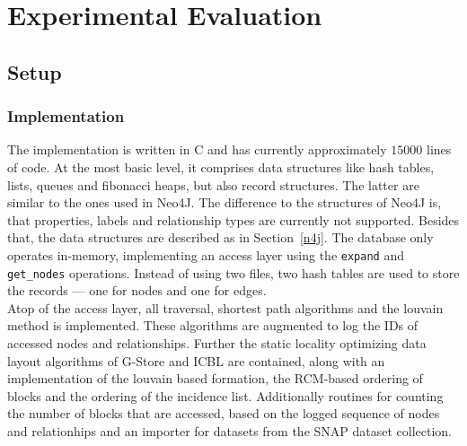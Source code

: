 \chapter{Experimental Evaluation}\label{\positionnumber} 
\section{Setup}\label{\positionnumber}
    \subsection*{Implementation}
        The implementation is written in C and has currently approximately $15 000$ lines of code.
        At the most basic level, it comprises data structures like hash tables, lists, queues and fibonacci heaps, but also record structures. 
        The latter are similar to the ones used in Neo4J. 
        The difference to the structures of Neo4J is, that properties, labels and relationship types are currently not supported.
        Besides that, the data structures are described as in Section~\ref{n4j}.
        The database only operates in-memory, implementing an access layer using the \texttt{expand} and \texttt{get_nodes} operations.
        Instead of using two files, two hash tables are used to store the records --- one for nodes and one for edges. \\
        Atop of the access layer, all traversal, shortest path algorithms and the louvain method is implemented. These algorithms are augmented to log the IDs of accessed nodes and relationships.
        Further the static locality optimizing data layout algorithms of G-Store and ICBL are contained, along with an implementation of the louvain based formation, the RCM-based ordering of blocks and the ordering of the incidence list.
        Additionally routines for counting the number of blocks that are accessed, based on the logged sequence of nodes and relationhips and an importer for datasets from the SNAP dataset collection.
    
    
